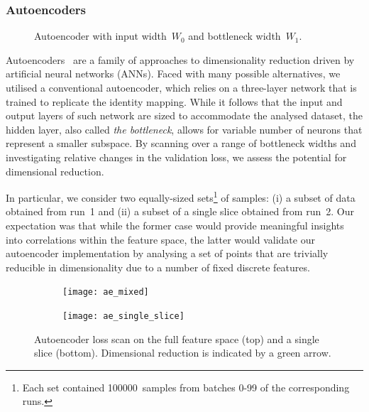 \subsubsection{Autoencoders}

\begin{figure}
	\centering
	\vspace{-5ex}
	{\footnotesize {}}
	\caption{Autoencoder with input width~$W_0$ and bottleneck width~$W_1$.}
	\label{fig:autoencoder}
	\vspace{-9ex}
\end{figure}

Autoencoders~\cite{SCHMIDHUBER201585} are a family of approaches to
dimensionality reduction driven by artificial neural
networks (ANNs). Faced with many possible alternatives, we utilised a conventional
autoencoder, which relies on a three-layer network that is trained to replicate
the identity mapping. While it follows that the input and output layers of such
network are sized to accommodate the analysed dataset, the
hidden layer, also called \textit{the bottleneck}, allows for variable number of
neurons that represent a smaller subspace. By scanning
over a range of bottleneck widths and investigating relative changes in the
validation loss, we assess the potential for dimensional reduction.

In particular, we consider two equally-sized sets\footnote{Each set contained
\num{100000}~samples from batches 0-99 of the corresponding runs.} of samples: (i) a subset of data obtained
from run~1 and (ii) a subset of a single slice obtained from run~2. Our
expectation was that while the former case would provide meaningful insights into
correlations within the feature space, the latter would validate our
autoencoder implementation by analysing a set of points that are trivially
reducible in dimensionality due to a number of fixed discrete features.

\begin{figure} %
	\centering
	\vspace{-1ex}
	\begin{subfigure}[b]{\linewidth}
		\texttt{[image: ae\_mixed]}
	\end{subfigure}

	\vspace{-0.2ex}

	\begin{subfigure}[b]{\linewidth}
		\texttt{[image: ae\_single\_slice]}
	\end{subfigure}

	\caption{Autoencoder loss scan on the full feature space (top) and a single slice
		(bottom). Dimensional reduction is indicated by a green arrow.}
	\label{fig:autoencoder-loss}
	\vspace{-10ex}
\end{figure}

